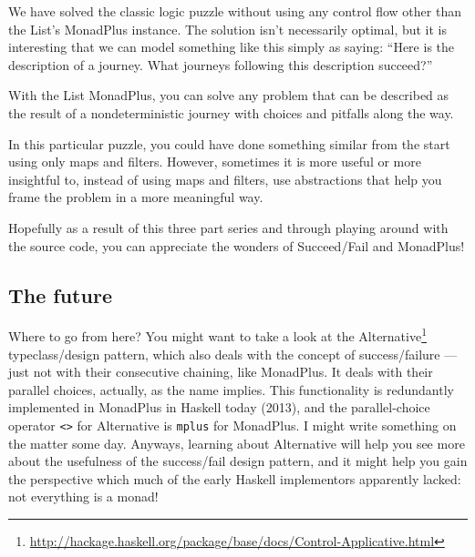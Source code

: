 \documentclass[]{article}
\renewcommand{\href}[2]{#2\footnote{\url{#1}}}
\begin{document}
We have solved the classic logic puzzle without using any control flow
other than the List's MonadPlus instance. The solution isn't necessarily
optimal, but it is interesting that we can model something like this
simply as saying: ``Here is the description of a journey. What journeys
following this description succeed?''

With the List MonadPlus, you can solve any problem that can be described
as the result of a nondeterministic journey with choices and pitfalls
along the way.

In this particular puzzle, you could have done something similar from
the start using only maps and filters. However, sometimes it is more
useful or more insightful to, instead of using maps and filters, use
abstractions that help you frame the problem in a more meaningful way.

Hopefully as a result of this three part series and through playing
around with the source code, you can appreciate the wonders of
Succeed/Fail and MonadPlus!

\subsection{The future}\label{the-future}

Where to go from here? You might want to take a look at the
\href{http://hackage.haskell.org/package/base/docs/Control-Applicative.html}{Alternative}
typeclass/design pattern, which also deals with the concept of
success/failure --- just not with their consecutive chaining, like
MonadPlus. It deals with their parallel choices, actually, as the name
implies. This functionality is redundantly implemented in MonadPlus in
Haskell today (2013), and the parallel-choice operator
\texttt{\textless{}\textbar{}\textgreater{}} for Alternative is
\texttt{mplus} for MonadPlus. I might write something on the matter some
day. Anyways, learning about Alternative will help you see more about
the usefulness of the success/fail design pattern, and it might help you
gain the perspective which much of the early Haskell implementors
apparently lacked: not everything is a monad!
\end{document}
